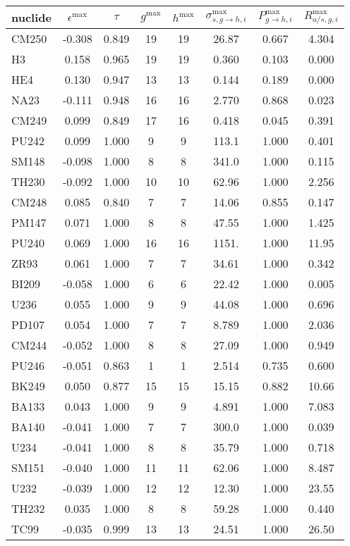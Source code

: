 \begin{tabular}{|l|ccccccc|}
\hline
nuclide & $\epsilon^{\max}$ & $\tau$ & $g^{\max}$ & $h^{\max}$ & $\sigma_{s,g\to h,i}^{\max}$ & $P_{g\to h,i}^{\max}$ & $R_{a/s,g,i}^{\max}$\\
\hline
CM250 & -0.308 & 0.849 & 19 & 19 & 26.87 & 0.667 & 4.304\\
H3 & 0.158 & 0.965 & 19 & 19 & 0.360 & 0.103 & 0.000\\
HE4 & 0.130 & 0.947 & 13 & 13 & 0.144 & 0.189 & 0.000\\
NA23 & -0.111 & 0.948 & 16 & 16 & 2.770 & 0.868 & 0.023\\
CM249 & 0.099 & 0.849 & 17 & 16 & 0.418 & 0.045 & 0.391\\
PU242 & 0.099 & 1.000 & 9 & 9 & 113.1 & 1.000 & 0.401\\
SM148 & -0.098 & 1.000 & 8 & 8 & 341.0 & 1.000 & 0.115\\
TH230 & -0.092 & 1.000 & 10 & 10 & 62.96 & 1.000 & 2.256\\
CM248 & 0.085 & 0.840 & 7 & 7 & 14.06 & 0.855 & 0.147\\
PM147 & 0.071 & 1.000 & 8 & 8 & 47.55 & 1.000 & 1.425\\
PU240 & 0.069 & 1.000 & 16 & 16 & 1151. & 1.000 & 11.95\\
ZR93 & 0.061 & 1.000 & 7 & 7 & 34.61 & 1.000 & 0.342\\
BI209 & -0.058 & 1.000 & 6 & 6 & 22.42 & 1.000 & 0.005\\
U236 & 0.055 & 1.000 & 9 & 9 & 44.08 & 1.000 & 0.696\\
PD107 & 0.054 & 1.000 & 7 & 7 & 8.789 & 1.000 & 2.036\\
CM244 & -0.052 & 1.000 & 8 & 8 & 27.09 & 1.000 & 0.949\\
PU246 & -0.051 & 0.863 & 1 & 1 & 2.514 & 0.735 & 0.600\\
BK249 & 0.050 & 0.877 & 15 & 15 & 15.15 & 0.882 & 10.66\\
BA133 & 0.043 & 1.000 & 9 & 9 & 4.891 & 1.000 & 7.083\\
BA140 & -0.041 & 1.000 & 7 & 7 & 300.0 & 1.000 & 0.039\\
U234 & -0.041 & 1.000 & 8 & 8 & 35.79 & 1.000 & 0.718\\
SM151 & -0.040 & 1.000 & 11 & 11 & 62.06 & 1.000 & 8.487\\
U232 & -0.039 & 1.000 & 12 & 12 & 12.30 & 1.000 & 23.55\\
TH232 & 0.035 & 1.000 & 8 & 8 & 59.28 & 1.000 & 0.440\\
TC99 & -0.035 & 0.999 & 13 & 13 & 24.51 & 1.000 & 26.50\\

\end{tabular}
